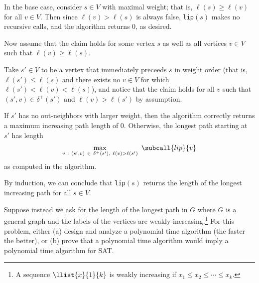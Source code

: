 \documentclass{article}
\begin{document}
\begin{solution}
\begin{subproof}[Correctness]
In the base case, consider \( s \in V \) with maximal weight; that is, \( \ell(s) \geq \ell(v) \) for all \( v \in V \). Then since \( \ell(v) > \ell(s) \) is always false, \texttt{lip}\( (s) \) makes no recursive calls, and the algorithm returns 0, as desired.

Now assume that the claim holds for some vertex \( s \) as well as all vertices \( v \in V \) such that \( \ell(v) \geq \ell(s) \).

Take \( s' \in V \) to be a vertex that immediately preceeds \( s \) in weight order (that is, \( \ell(s') \leq \ell(s) \) and there exists no \( v \in V \) for which \( \ell(s') < \ell(v) < \ell(s) \)), and notice that the claim holds for all \( v \) such that \( (s',v) \in \delta^{+}(s') \) and \( \ell(v) > \ell(s') \) by assumption.

If \( s' \) has no out-neighbors with larger weight, then the algorithm correctly returns a maximum increasing path length of 0. Otherwise, the longest path starting at \( s' \) has length
\begin{align*}
    \max_{v \ : \ (s',v) \ \in \ \delta^{+}(s'), \ \ell(v) > \ell(s')}  \ \subcall{lip}{v}
\end{align*}
as computed in the algorithm.

By induction, we can conclude that \texttt{lip}\( (s) \) returns the length of the longest increasing path for all \( s \in V \).
\end{subproof}
\end{solution}
\pagebreak






\begin{subexercise}
  Suppose instead we ask for the length of the longest path in \( G \) where \( G \) is a general graph and the labels of the vertices are weakly increasing.\footnote[4]{A sequence \( \llist{x}{1}{k} \) is weakly increasing if \( x_1\leq x_2\leq \cdots\leq x_k \).}
  For this problem, either (a) design and analyze a polynomial time algorithm (the faster the better), or (b) prove that a polynomial time algorithm would imply a polynomial time algorithm for SAT.
\end{subexercise}
\end{document}
